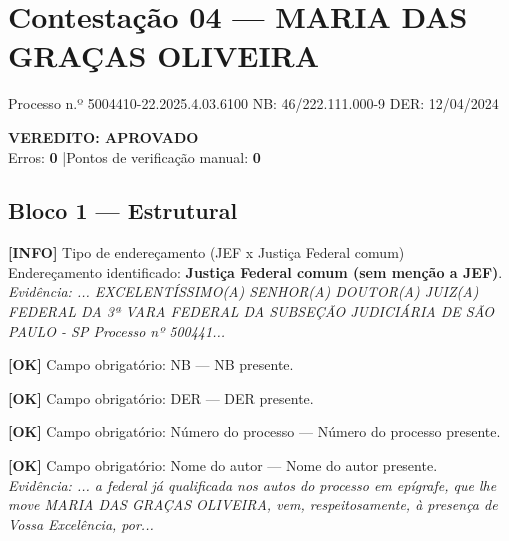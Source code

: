 \documentclass[12pt,a4paper]{article}
\newcommand{\statusOK}[1]{\textcolor{corOK}{\textbf{[OK]}} #1}
\newcommand{\statusINFO}[1]{\textcolor{corINFO}{\textbf{[INFO]}} #1}
\begin{document}
\clearpage
{}
\section{Contestação 04 --- MARIA DAS GRAÇAS OLIVEIRA}
\begin{center}
  {\small Processo n.º 5004410-22.2025.4.03.6100 \quad NB: 46/222.111.000-9 \quad DER: 12/04/2024}
\end{center}

\vspace{0.5em}

\noindent\colorbox{corFundoAprovado}{%
  \begin{minipage}{\dimexpr\linewidth-2\fboxsep}
    \centering
    \vspace{0.3em}
    {\large \textcolor{corOK}{\textbf{VEREDITO: APROVADO}}}\\
    Erros: \textbf{0} \quad|\quad Pontos de verificação manual: \textbf{0}
    \vspace{0.3em}
  \end{minipage}%
}

\vspace{1em}


\subsection{Bloco 1 --- Estrutural}

\statusINFO{Tipo de endereçamento (JEF x Justiça Federal comum)}\\
Endereçamento identificado: \textbf{Justiça Federal comum (sem menção a JEF)}.\\
\textit{Evidência: ... EXCELENTÍSSIMO(A) SENHOR(A) DOUTOR(A) JUIZ(A) FEDERAL DA 3ª VARA FEDERAL DA SUBSEÇÃO JUDICIÁRIA DE SÃO PAULO - SP Processo nº 500441...}

\medskip
\statusOK{Campo obrigatório: NB} --- NB presente.

\medskip
\statusOK{Campo obrigatório: DER} --- DER presente.

\medskip
\statusOK{Campo obrigatório: Número do processo} --- Número do processo presente.

\medskip
\statusOK{Campo obrigatório: Nome do autor} --- Nome do autor presente.\\
\textit{Evidência: ... a federal já qualificada nos autos do processo em epígrafe, que lhe move MARIA DAS GRAÇAS OLIVEIRA, vem, respeitosamente, à presença de Vossa Excelência, por...}
\end{document}
